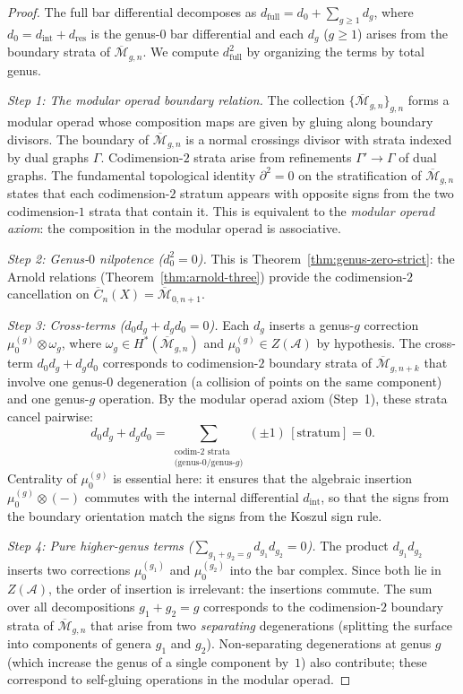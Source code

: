 \begin{proof}
The full bar differential decomposes as
$d_{\mathrm{full}} = d_0 + \sum_{g \geq 1} d_g$,
where $d_0 = d_{\mathrm{int}} + d_{\mathrm{res}}$ is the genus-$0$ bar
differential and each $d_g$ ($g \geq 1$) arises from the boundary strata of
$\overline{\mathcal{M}}_{g,n}$.  We compute $d_{\mathrm{full}}^2$ by organizing
the terms by total genus.

\medskip
\emph{Step 1: The modular operad boundary relation.}
The collection $\{\overline{\mathcal{M}}_{g,n}\}_{g,n}$ forms a modular operad
whose composition maps are given by gluing along boundary divisors.  The
boundary of $\overline{\mathcal{M}}_{g,n}$ is a normal crossings divisor with
strata indexed by dual graphs $\Gamma$.  Codimension-$2$ strata arise from
refinements $\Gamma' \to \Gamma$ of dual graphs.  The fundamental topological
identity $\partial^2 = 0$ on the stratification of $\overline{\mathcal{M}}_{g,n}$
states that each codimension-$2$ stratum appears with opposite signs from the two
codimension-$1$ strata that contain it.  This is equivalent to the \emph{modular
operad axiom}: the composition in the modular operad is associative.

\medskip
\emph{Step 2: Genus-$0$ nilpotence ($d_0^2 = 0$).}
This is Theorem~\ref{thm:genus-zero-strict}: the Arnold relations
(Theorem~\ref{thm:arnold-three}) provide the codimension-$2$ cancellation on
$\overline{C}_n(X) = \overline{\mathcal{M}}_{0,n+1}$.

\medskip
\emph{Step 3: Cross-terms ($d_0 d_g + d_g d_0 = 0$).}
Each $d_g$ inserts a genus-$g$ correction $\mu_0^{(g)} \otimes \omega_g$,
where $\omega_g \in H^*(\overline{\mathcal{M}}_{g,n})$ and
$\mu_0^{(g)} \in Z(\mathcal{A})$ by hypothesis.  The cross-term
$d_0 d_g + d_g d_0$ corresponds to codimension-$2$ boundary strata of
$\overline{\mathcal{M}}_{g,n+k}$ that involve one genus-$0$ degeneration
(a collision of points on the same component) and one genus-$g$ operation.
By the modular operad axiom (Step~1), these strata cancel pairwise:
\[
  d_0 d_g + d_g d_0 = \sum_{\substack{\text{codim-2 strata} \\ \text{(genus-0/genus-$g$)}}}
  (\pm 1)\, [\text{stratum}] = 0.
\]
Centrality of $\mu_0^{(g)}$ is essential here: it ensures that the algebraic
insertion $\mu_0^{(g)} \otimes (-)$ commutes with the internal differential
$d_{\mathrm{int}}$, so that the signs from the boundary orientation match the
signs from the Koszul sign rule.

\medskip
\emph{Step 4: Pure higher-genus terms ($\sum_{g_1 + g_2 = g} d_{g_1} d_{g_2} = 0$).}
The product $d_{g_1} d_{g_2}$ inserts two corrections
$\mu_0^{(g_1)}$ and $\mu_0^{(g_2)}$ into the bar complex.  Since both lie in
$Z(\mathcal{A})$, the order of insertion is irrelevant: the insertions commute.
The sum over all decompositions $g_1 + g_2 = g$ corresponds to the codimension-$2$
boundary strata of $\overline{\mathcal{M}}_{g,n}$ that arise from two
\emph{separating} degenerations (splitting the surface into components of genera
$g_1$ and $g_2$).  Non-separating degenerations at genus $g$ (which increase the
genus of a single component by~$1$) also contribute; these correspond to
self-gluing operations in the modular operad.


\end{proof}
